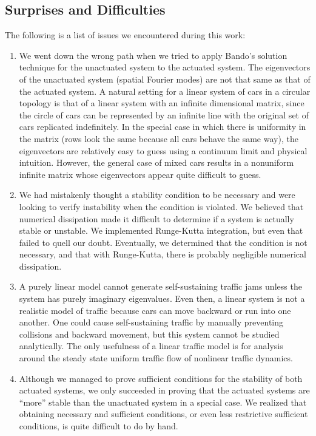 \documentclass[10pt,twocolumn]{article}
\theoremstyle{ss}
\begin{document}
\subsection{Surprises and Difficulties}
The following is a list of issues we encountered during this work:
\begin{enumerate}
\item We went down the wrong path when we tried to apply Bando's \cite{Bando} solution technique for the unactuated system to the actuated system. The eigenvectors of the unactuated system (spatial Fourier modes) are not that same as that of the actuated system. A natural setting for a linear system of cars in a circular topology is that of a linear system with an infinite dimensional matrix, since the circle of cars can be represented by an infinite line with the original set of cars replicated indefinitely. In the special case in which there is uniformity in the matrix (rows look the same because all cars behave the same way), the eigenvectors are relatively easy to guess using a continuum limit and physical intuition. However, the general case of mixed cars results in a nonuniform infinite matrix whose eigenvectors appear quite difficult to guess.
\item  We had mistakenly thought a stability condition to be necessary and were looking to verify instability when the condition is violated. We believed that numerical dissipation made it difficult to determine if a system is actually stable or unstable. We implemented Runge-Kutta integration, but even that failed to quell our doubt. Eventually, we determined that the condition is not necessary, and that with Runge-Kutta, there is probably negligible numerical dissipation.
\item A purely linear model cannot generate self-sustaining traffic jams unless the system has purely imaginary eigenvalues. Even then, a linear system is not a realistic model of traffic because cars can move backward or run into one another. One could cause self-sustaining traffic by manually preventing collisions and backward movement, but this system cannot be studied analytically. The only usefulness of a linear traffic model is for analysis around the steady state uniform traffic flow of nonlinear traffic dynamics.
\item Although we managed to prove sufficient conditions for the stability of both actuated systems, we only succeeded in proving that the actuated systems are ``more'' stable than the unactuated system in a special case. We realized that obtaining necessary and sufficient conditions, or even less restrictive sufficient conditions, is quite difficult to do by hand.
\end{enumerate}
\end{document}
